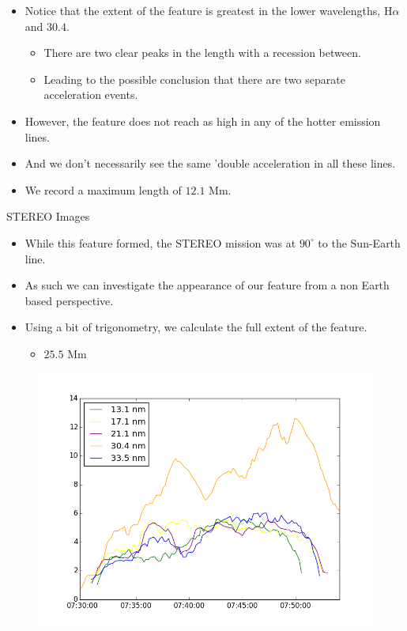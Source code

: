 \documentclass{beamer}
\begin{document}

	\begin{frame}
	\end{frame}


	\begin{frame}
		\begin{itemize}
			\item{Notice that the extent of the feature is greatest in the lower wavelengths, H$\alpha$ and $30.4$.}
			\begin{itemize}
				\item{There are two clear peaks in the length with a recession between.}
				\item{Leading to the possible conclusion that there are two separate acceleration events.}
			\end{itemize}
			\item{However, the feature does not reach as high in any of the hotter emission lines.}
			\item{And we don't necessarily see the same 'double acceleration in all these lines.}
			\item{We record a maximum length of $12.1$ Mm.}
		\end{itemize}
	\end{frame}

	
	\begin{frame}{STEREO Images}
		\begin{itemize}
			\item{While this feature formed, the STEREO mission was at $90^\circ$ to the Sun-Earth line.}
			\item{As such we can investigate the appearance of our feature from a non Earth based perspective.}
			\item{Using a bit of trigonometry, we calculate the full extent of the feature.}
			\begin{itemize}
				\item{$\mathbf{25.5}$ Mm}
			\end{itemize}
		\end{itemize}
		\begin{figure}
			\includegraphics[scale=0.4]{Figs/len_plot.png}
		\end{figure}
	\end{frame}
	
\end{document}
